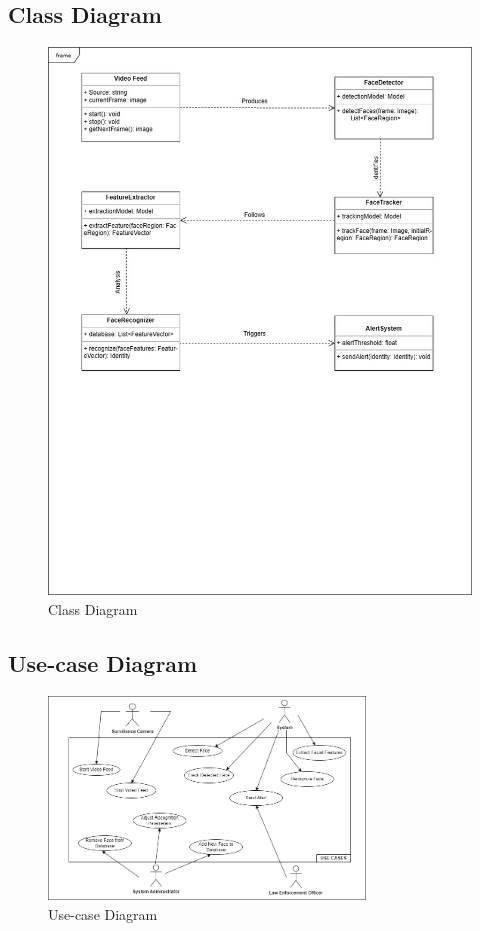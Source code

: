 	\subsection{Class Diagram}
	\begin{figure}[h!]
		\includegraphics[width=\textwidth]{components/images/class.jpeg}
		\caption{Class Diagram}
		\label{fig:class}
	\end{figure}

	\pagebreak 

	\subsection{Use-case Diagram}
		\begin{figure}[h!]
			\centering
			\includegraphics[width=0.75\textwidth]{components/images/use-case.png}
			\caption{Use-case Diagram}
			\label{fig:use-case-rep}
		\end{figure}

